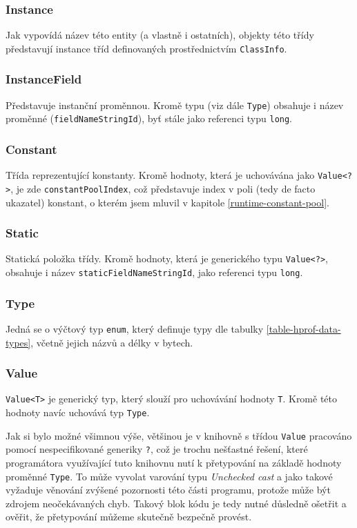 \subsubsection{Instance}
Jak vypovídá název této entity (a vlastně i ostatních), objekty této třídy představují instance tříd definovaných prostřednictvím \texttt{ClassInfo}. 

\subsubsection{InstanceField}
Představuje instanční proměnnou. Kromě typu (viz dále \texttt{Type}) obsahuje i název proměnné (\texttt{fieldNameStringId}), byť stále jako referenci typu \texttt{long}.

\subsubsection{Constant}
Třída reprezentující konstanty. Kromě hodnoty, která je uchovávána jako \texttt{Value<?>}, je zde \texttt{constantPoolIndex}, což představuje index v poli (tedy de facto ukazatel) konstant, o kterém jsem mluvil v kapitole \ref{runtime-constant-pool}.

\subsubsection{Static}
Statická položka třídy. Kromě hodnoty, která je generického typu \texttt{Value<?>}, obsahuje i název \texttt{staticFieldNameStringId}, jako referenci typu \texttt{long}.

\subsubsection{Type}
Jedná se o výčtový typ \texttt{enum}, který definuje typy dle tabulky \ref{table-hprof-data-types}, včetně jejich názvů a délky v bytech.

\subsubsection{Value}
\texttt{Value<T>} je generický typ, který slouží pro uchovávání hodnoty \texttt{T}. Kromě této hodnoty navíc uchovává typ \texttt{Type}. 

Jak si bylo možné všimnou výše, většinou je v knihovně s třídou \texttt{Value} pracováno pomocí nespecifikované generiky \texttt{?}, což je trochu nešťastné řešení, které programátora využívající tuto knihovnu nutí k přetypování na základě hodnoty proměnné \texttt{Type}. To může vyvolat varování typu \textit{Unchecked cast} a jako takové vyžaduje věnování zvýšené pozornosti této části programu, protože může být zdrojem neočekávaných chyb. Takový blok kódu je tedy nutné důsledně ošetřit a ověřit, že přetypování můžeme skutečně bezpečně provést.

